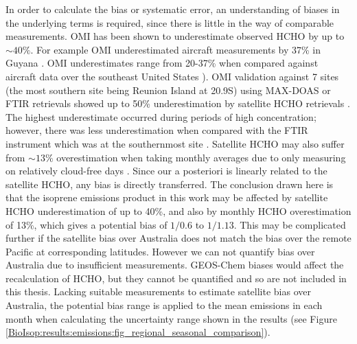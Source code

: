     In order to calculate the bias or systematic error, an understanding of biases in the underlying terms is required, since there is little in the way of comparable measurements.
    OMI has been shown to underestimate observed HCHO by up to $\sim40\%$.
    For example OMI underestimated aircraft measurements by 37\% in Guyana \parencite{Barkley2013}.
    OMI underestimates range from 20-37\% when compared against aircraft data over the southeast United States \parencite{Zhu2016}).
    OMI validation against 7 sites (the most southern site being Reunion Island at 20.9\degr S) using MAX-DOAS or FTIR retrievals showed up to 50\% underestimation by satellite HCHO retrievals \parencite{DeSmedt2015}.
    The highest underestimate occurred during periods of high concentration; however, there was less underestimation when compared with the FTIR instrument which was at the southernmost site \parencite{Vigouroux2009,DeSmedt2015}.
    Satellite HCHO may also suffer from $\sim{13}\%$ overestimation when taking monthly averages due to only measuring on relatively cloud-free days \parencite{Surl2018}.
    Since our a posteriori is linearly related to the satellite HCHO, any bias is directly transferred.
    The conclusion drawn here is that the isoprene emissions product in this work may be affected by satellite HCHO underestimation of up to 40\%, and also by monthly HCHO overestimation of 13\%, which gives a potential bias of $1/0.6$ to $1/1.13$.
    This may be complicated further if the satellite bias over Australia does not match the bias over the remote Pacific at corresponding latitudes.
    However we can not quantify bias over Australia due to insufficient measurements.
    GEOS-Chem biases would affect the recalculation of HCHO, but they cannot be quantified and so are not included in this thesis.
    Lacking suitable measurements to estimate satellite bias over Australia, the potential bias range is applied to the mean emissions in each month when calculating the uncertainty range shown in the results (see Figure \ref{BioIsop:results:emissions:fig_regional_seasonal_comparison}).
    
      
      
